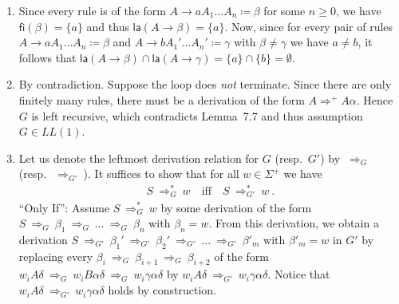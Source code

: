 \begin{solution}
	\begin{enumerate}
		\item Since every rule is of the form $A \rightarrow aA_1\ldots A_n \coloneqq \beta$ for some $n\geq 0$, we have $\textsf{fi}(\beta) = \{a\}$ and thus $\textsf{la}(A \rightarrow \beta) =\{a\}$. Now, since for every pair of rules $A \rightarrow a A_1 \dots A_n \coloneqq \beta$ and $A \rightarrow b A_1' \dots A_n' \coloneqq \gamma$ with $\beta \neq \gamma$ we have $a \neq b$, it follows that $\textsf{la}(A \rightarrow \beta) \cap \textsf{la}(A \rightarrow \gamma) = \{a\} \cap \{b\} = \emptyset$.
		\item By contradiction. Suppose the loop does \emph{not} terminate. Since there are only finitely many rules, there must be a derivation of the form $A \Rightarrow^+ A\alpha$. Hence $G$ is left recursive, which contradicts Lemma~7.7 and thus assumption $G \in LL(1)$.
		\newcommand{\dg}{~{\Rightarrow_{G}}~}
		\newcommand{\dgp}{~{\Rightarrow_{G'}}~}
		\newcommand{\dgs}{~{\Rightarrow_{G}^*}~}
		\newcommand{\dgps}{~{\Rightarrow_{G'}^*}~}
		\item Let us denote the leftmost derivation relation for $G$ (resp.\ $G'$) by $\dg$ (resp.\ $\dgp$). It suffices to show that for all $w \in  \Sigma^+$ we have
		\begin{align*}
		   S \dgs w \quad \text{iff} \quad S \dgps w~.
		\end{align*}
		\enquote{Only If}:
		Assume $S \dgs w$ by some derivation of the form $S \dg \beta_1 \dg \ldots \dg \beta_n$ with $\beta_n = w$. From this derivation, we obtain a derivation $S \dgp \beta_1' \dgp \beta_2' \dgp \ldots \dgp \beta'_{m}$ with $\beta'_m = w$ in $G'$ by replacing every $\beta_{i} \dg \beta_{i+1} \dg \beta_{i+2}$ of the form $w_i A \delta \dg w_i B \alpha \delta \dg w_i \gamma \alpha \delta $ by $w_i A \delta \dgp w_i \gamma \alpha \delta$. Notice that $w_i A \delta \dgp w_i \gamma \alpha \delta$ holds by construction. \\ \\%
		\noindent

\end{enumerate}
\end{solution}
